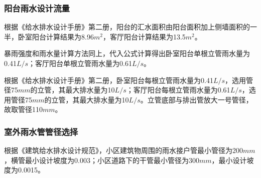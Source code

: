 \documentclass{gdutart}
\begin{document}
      \subsubsection{阳台雨水设计流量}
        根据《给水排水设计手册》第二册，阳台的汇水面积由阳台面积加上侧墙面积的一半，卧室阳台计算结果为8.96$m^2$，客厅阳台计算结果为13.5$m^2$。

        暴雨强度和雨水量计算方法同上，代入公式计算得出卧室阳台单根立管雨水量为0.41$L/s$；客厅阳台单根立管雨水量为0.61$L/s$。

        根据《给水排水设计手册》第二册，卧室阳台每根立管雨水量为0.41$L/s$，选用管径75$mm$的立管，其最大排水量为10$L/s$；客厅阳台每根立管雨水量为0.61$L/s$，选用管径75$mm$的立管，其最大排水量为10$L/s$。立管底部与排出管放大一号管径，故取管径110$mm$。

      \subsubsection{室外雨水管管径选择}
        根据《建筑给水排水设计规范》，小区建筑物周围的雨水接户管最小管径为200$mm$，横管最小设计坡度为0.003；小区道路下的干管最小管径为300$mm$，最小设计坡度为0.0015。
\end{document}
